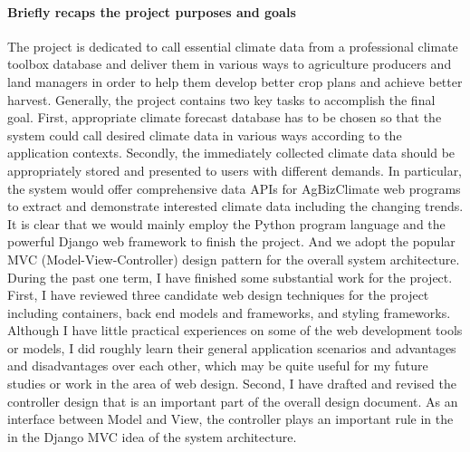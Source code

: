 \documentclass[onecolumn, draftclsnofoot,10pt, compsoc]{article}
\begin{document}
		\paragraph{Briefly recaps the project purposes and goals} \hfill \break
		The project is dedicated to call essential climate data from a professional climate toolbox database and deliver them in various ways to agriculture producers and land managers in order to help them develop better crop plans and achieve better harvest. Generally, the project contains two key tasks to accomplish the final goal. First, appropriate climate forecast database has to be chosen so that the system could call desired climate data in various ways according to the application contexts. Secondly, the immediately collected climate data should be appropriately stored and presented to users with different demands. In particular, the system would offer comprehensive data APIs for AgBizClimate web programs to extract and demonstrate interested climate data including the changing trends.\\
		It is clear that we would mainly employ the Python program language and the powerful Django web framework to finish the project. And we adopt the popular MVC (Model-View-Controller) design pattern for the overall system architecture. During the past one term, I have finished some substantial work for the project. First, I have reviewed three candidate web design techniques for the project including containers, back end models and frameworks, and styling frameworks. Although I have little practical experiences on some of the web development tools or models, I did roughly learn their general application scenarios and advantages and disadvantages over each other, which may be quite useful for my future studies or work in the area of web design. Second, I have drafted and revised the controller design that is an important part of the overall design document. As an interface between Model and View, the controller plays an important rule in the in the Django MVC idea of the system architecture.\\
\end{document}
